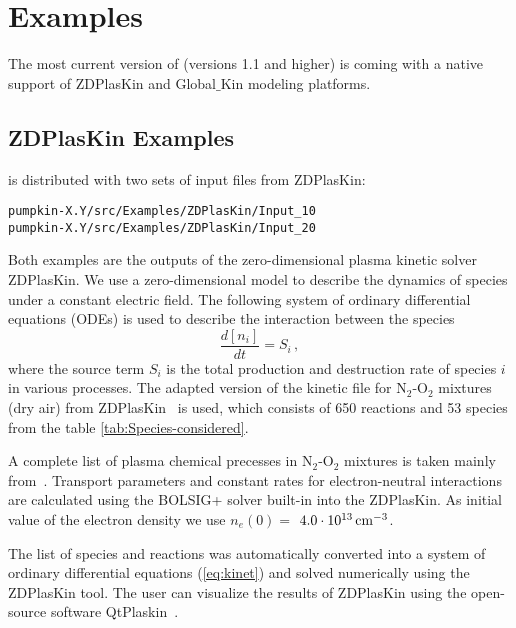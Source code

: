 
\chapter{Examples}
\label{chap_4}

The most current version of \pump{} (versions 1.1 and higher) is coming with a native support of ZDPlasKin and Global$\_$Kin modeling platforms.

\section{ZDPlasKin Examples}

\pump{} is distributed with two sets of input files from ZDPlasKin:
\begin{display}
\begin{verbatim}
pumpkin-X.Y/src/Examples/ZDPlasKin/Input_10
pumpkin-X.Y/src/Examples/ZDPlasKin/Input_20
\end{verbatim}
\end{display}

Both examples are the outputs of the zero-dimensional plasma kinetic solver ZDPlasKin. We use a zero-dimensional model to describe the dynamics of species under a constant electric field. The following system of ordinary differential equations (ODEs) is used to describe the interaction between the species
\begin{equation}
\label{eq:kinet}
\frac{d[n_i]}{dt}=S_i\,,
\end{equation}
where the source term $S_i$  is the total production and destruction rate of species $i$ in various processes. 
The adapted version of the kinetic file for N$_2$-O$_2$ mixtures (dry air) from ZDPlasKin~\cite{Zdplaskin,Flitti2009/EPJAP} is used, which consists of 650 reactions and 53 species from the table \ref{tab:Species-considered}. 

A complete list of plasma chemical precesses in N$_2$-O$_2$ mixtures is taken mainly from~\cite{Capitelli2000/book}. Transport parameters and constant rates for electron-neutral interactions are calculated using 
the BOLSIG+ solver built-in into the ZDPlasKin. As initial value of the electron density we use $n_e(0) = $ $4.0\cdot 10^{13}\,\mathrm{cm^{-3}}$. 

The list of species and reactions was automatically converted into a system of ordinary differential equations (\ref{eq:kinet}) and solved numerically using the ZDPlasKin tool. The user can visualize the results of ZDPlasKin using the open-source software QtPlaskin~\cite{Qtplaskin}.


